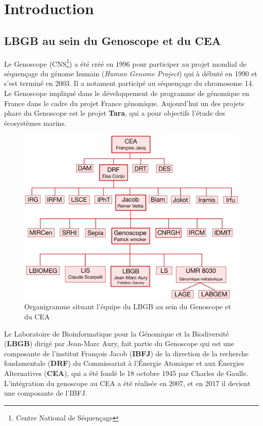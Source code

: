\section{Introduction}
\subsection{LBGB au sein du Genoscope et du CEA}
Le Genoscope (CNS\footnote{Centre National de Séquençage}) a été créé en 1996 pour participer au projet mondial de séquençage du génome humain (\emph{Human Genome Project}) qui à débuté en 1990 et s'est terminé en 2003. Il a notament participé au séquençage du chromosome 14. Le Genoscope impliqué dans le développement de programme de génomique en France dans le cadre du projet France génomique. Aujourd'hui un des projets phare du Genoscope est le projet \textbf{Tara}, qui a pour objectifs l'étude des écosystèmes marins.

\begin{minipage}{0.40\textwidth}
\begin{figure}[H]
    \centering
    \includegraphics[width=1\textwidth]{img/organigramme.jpg}
    \caption{Organigramme situant l’équipe du LBGB au sein du Genoscope et du CEA}
    \label{organigramme_LBGB}
\end{figure}
\end{minipage} 
\hfill
\begin{minipage}{0.5\textwidth}
    Le Laboratoire de Bioinformatique pour la Génomique et la Biodiversité (\textbf{LBGB}) dirigé par Jean-Marc Aury, fait partie du Genoscope qui est une composante de l'institut François Jacob (\textbf{IBFJ}) de la direction de la recherche fondamentale (\textbf{DRF}) du Commissariat à l'Énergie Atomique et aux Énergies Alternatives (\textbf{CEA}), qui a été fondé le 18 octobre 1945 par Charles de Gaulle. L'intégration du genoscope au CEA a été réalisée en 2007, et en 2017 il devient une composante de l'IBFJ.
\end{minipage}

